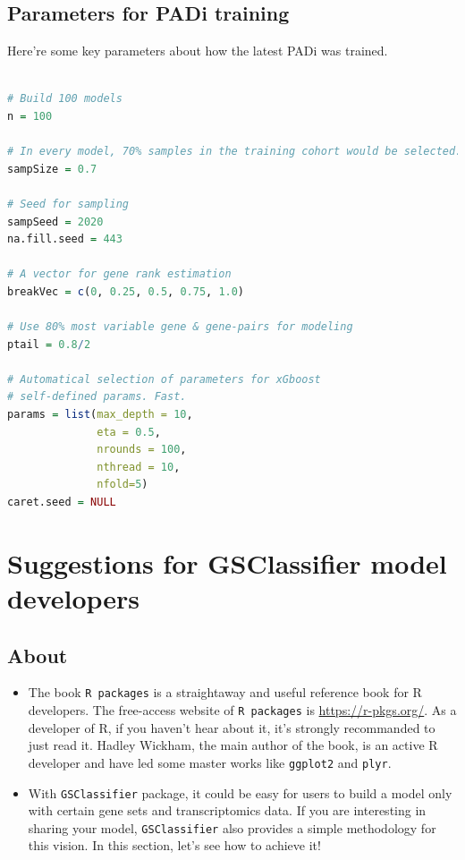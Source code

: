 \documentclass[
  12pt,
]{book}
\newcommand{\passthrough}[1]{#1}
\begin{document}
\hypertarget{padiPara}{%
\section{Parameters for PADi training}\label{padiPara}}

Here're some key parameters about how the latest PADi was trained.

\begin{lstlisting}[language=R]

# Build 100 models
n = 100

# In every model, 70% samples in the training cohort would be selected.
sampSize = 0.7

# Seed for sampling
sampSeed = 2020
na.fill.seed = 443

# A vector for gene rank estimation
breakVec = c(0, 0.25, 0.5, 0.75, 1.0)

# Use 80% most variable gene & gene-pairs for modeling
ptail = 0.8/2

# Automatical selection of parameters for xGboost
# self-defined params. Fast.
params = list(max_depth = 10,
              eta = 0.5,
              nrounds = 100,
              nthread = 10,
              nfold=5)
caret.seed = NULL
\end{lstlisting}

\hypertarget{suggestions-for-gsclassifier-model-developers}{%
\chapter{Suggestions for GSClassifier model developers}\label{suggestions-for-gsclassifier-model-developers}}

\hypertarget{about-3}{%
\section{About}\label{about-3}}

\begin{itemize}
\item
  The book \passthrough{\lstinline!R packages!} is a straightaway and useful reference book for R developers. The free-access website of \passthrough{\lstinline!R packages!} is \url{https://r-pkgs.org/}. As a developer of R, if you haven't hear about it, it's strongly recommanded to just read it. Hadley Wickham, the main author of the book, is an active R developer and have led some master works like \passthrough{\lstinline!ggplot2!} and \passthrough{\lstinline!plyr!}.
\item
  With \passthrough{\lstinline!GSClassifier!} package, it could be easy for users to build a model only with certain gene sets and transcriptomics data. If you are interesting in sharing your model, \passthrough{\lstinline!GSClassifier!} also provides a simple methodology for this vision. In this section, let's see how to achieve it!
\end{itemize}
\end{document}
